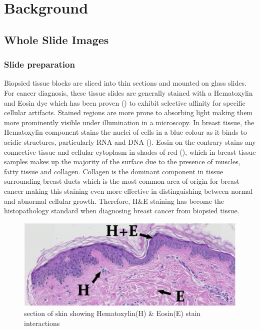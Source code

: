 \documentclass{l4proj}
\begin{document}
\chapter{Background}

\section{Whole Slide Images}\label{wsi-background}
\subsection{Slide preparation}
Biopsied tissue blocks are sliced into thin sections and mounted on glass slides. For cancer diagnosis, these tissue slides are generally stained with a Hematoxylin and Eosin dye which has been proven (\textit{\cite{Bancroft2013}}) to exhibit selective affinity for specific cellular artifacts. Stained regions are more prone to absorbing light making them more prominently visible under illumination in a microscopy. In breast tissue, the Hematoxylin component stains the nuclei of cells in a blue colour as it binds to acidic structures, particularly RNA and DNA (\textit{\cite{chan2014wonderful}}). Eosin on the contrary stains any connective tissue and cellular cytoplasm in shades of red (\textit{\cite{Bancroft2013}}), which in breast tissue samples makes up the majority of the surface due to the presence of muscles, fatty tissue and collagen. Collagen is the dominant component in tissue surrounding breast ducts which is the most common area of origin for breast cancer making this staining even more effective in distinguishing between normal and abnormal cellular growth. Therefore, H\&E staining has become the histopathology standard when diagnosing breast cancer from biopsied tissue.

\begin{figure}[h]
\centering
\includegraphics[scale=1.2]{images/HE-stain-example.jpg}
\caption{section of skin showing Hematoxylin(H) \& Eosin(E) stain interactions}
\label{fig:HE-fig}
\end{figure}
\end{document}
